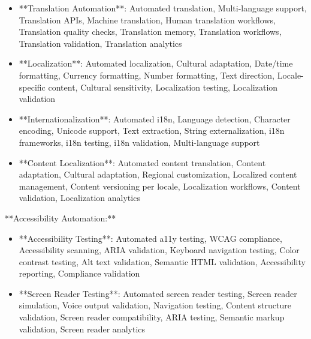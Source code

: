 \documentclass[11pt,a4paper]{article}
\begin{document}
\begin{itemize}
\item **Translation Automation**: Automated translation, Multi-language support, Translation APIs, Machine translation, Human translation workflows, Translation quality checks, Translation memory, Translation workflows, Translation validation, Translation analytics
\end{itemize}

\begin{itemize}
\item **Localization**: Automated localization, Cultural adaptation, Date/time formatting, Currency formatting, Number formatting, Text direction, Locale-specific content, Cultural sensitivity, Localization testing, Localization validation
\end{itemize}

\begin{itemize}
\item **Internationalization**: Automated i18n, Language detection, Character encoding, Unicode support, Text extraction, String externalization, i18n frameworks, i18n testing, i18n validation, Multi-language support
\end{itemize}

\begin{itemize}
\item **Content Localization**: Automated content translation, Content adaptation, Cultural adaptation, Regional customization, Localized content management, Content versioning per locale, Localization workflows, Content validation, Localization analytics
\end{itemize}

**Accessibility Automation:**

\begin{itemize}
\item **Accessibility Testing**: Automated a11y testing, WCAG compliance, Accessibility scanning, ARIA validation, Keyboard navigation testing, Color contrast testing, Alt text validation, Semantic HTML validation, Accessibility reporting, Compliance validation
\end{itemize}

\begin{itemize}
\item **Screen Reader Testing**: Automated screen reader testing, Screen reader simulation, Voice output validation, Navigation testing, Content structure validation, Screen reader compatibility, ARIA testing, Semantic markup validation, Screen reader analytics
\end{itemize}
\end{document}
